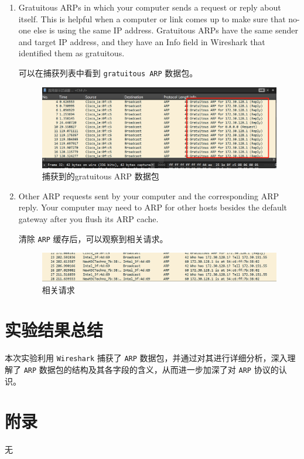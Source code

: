 \documentclass{article}
\begin{document}
\begin{enumerate}
		\item Gratuitous ARPs in which your computer sends a request or reply about itself. This is helpful when a computer or link comes up to make sure that no-one else is using the same IP address. Gratuitous ARPs have the same sender and target IP address, and they have an Info field in Wireshark that identified them as gratuitous.
		
		可以在捕获列表中看到 \texttt{gratuitous ARP} 数据包。
		
		\begin{figure}[H]
			\centering
			\includegraphics[width=11cm]{images/14.捕获到的gratuitous ARP 数据包.png}
			\caption{捕获到的gratuitous ARP 数据包}
		\end{figure}
		
		\item Other ARP requests sent by your computer and the corresponding ARP reply. Your computer may need to ARP for other hosts besides the default gateway after you flush its ARP cache. 
		
		清除 \texttt{ARP} 缓存后，可以观察到相关请求。
		
		\begin{figure}[H]
			\centering
			\includegraphics[width=11cm]{images/15.相关请求.png}
			\caption{相关请求}
		\end{figure}
	\end{enumerate}
	
	\section{实验结果总结}
	
	本次实验利用 \texttt{Wireshark} 捕获了 \texttt{ARP} 数据包，并通过对其进行详细分析，深入理解了 \texttt{ARP} 数据包的结构及其各字段的含义，从而进一步加深了对 \texttt{ARP} 协议的认识。
	
	
	\section{附录}
	
	无
	
\end{document}
